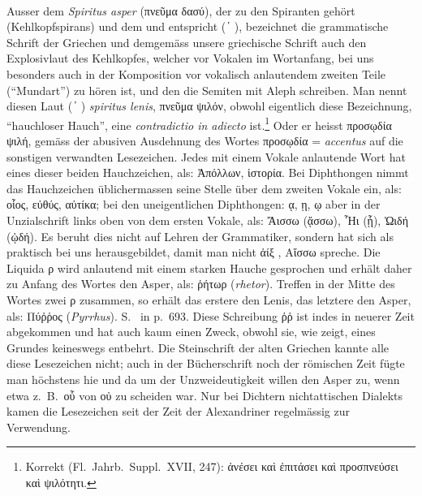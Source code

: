 \paragraph{} Ausser dem \emph{Spiritus asper} (πνεῦμα δασύ), der zu den Spiranten
gehört (Kehlkopfspirans) und dem  und
  entspricht {(\hspace{0.3em}  ̔\ )}, bezeichnet die grammatische Schrift der Griechen und demgemäss unsere griechische Schrift auch den Explosivlaut des Kehlkopfes, welcher vor Vokalen im Wortanfang, bei uns besonders auch in der Komposition vor vokalisch anlautendem zweiten Teile (“Mundart”) zu hören ist, und den die Semiten mit Aleph schreiben.
Man nennt diesen Laut {(\hspace{0.3em} ̓\ )} \emph{spiritus lenis}, πνεῦμα ψιλόν, obwohl eigentlich diese
Bezeichnung, “hauchloser Hauch”, eine \emph{contradictio in adiecto} ist.\footnote{
	Korrekt   (Fl.\ Jahrb.\ Suppl.\ XVII, 247):
	ἀνέσει καὶ ἐπιτάσει καὶ προσπνεύσει καὶ ψιλότητι.
}
Oder er heisst προσῳδία ψιλή, gemäss der abusiven Ausdehnung des Wortes προσῳδία
= \emph{accentus} auf die sonstigen verwandten Lesezeichen.
Jedes mit einem Vokale anlautende Wort hat eines dieser beiden Hauchzeichen, als: Ἀπόλλων, ἱστορία.
Bei Diphthongen nimmt das Hauchzeichen üblichermassen seine Stelle über dem zweiten Vokale ein, als: οἷος, εὐθύς, αὐτίκα; bei den uneigentlichen Diphthongen: ᾳ, ῃ, ῳ aber in der Unzialschrift links oben von dem ersten Vokale, als: Ἄισσω (ᾄσσω), Ἧι (ᾗ), Ὠιδή (ᾠδή).
Es beruht dies nicht auf Lehren der Grammatiker, sondern hat sich als praktisch
bei uns herausgebildet, damit man nicht ἀίξ , Αἴσσω  spreche.
Die Liquida ρ wird anlautend mit einem starken Hauche gesprochen und erhält
daher zu Anfang des Wortes den Asper, als: ῥήτωρ (\emph{rhetor}).
Treffen in der Mitte des Wortes zwei ρ zusammen, so erhält das erstere den
Lenis, das letztere den Asper, als: Πύῤῥος (\emph{Pyrrhus}).
S.\  in  p.\ 693.
Diese Schreibung ῤῥ ist indes in neuerer Zeit abgekommen und hat auch kaum einen
Zweck, obwohl sie, wie   zeigt, eines Grundes keineswegs entbehrt.
Die Steinschrift der alten Griechen kannte alle diese Lesezeichen nicht; auch in
der Bücherschrift noch der römischen Zeit fügte man höchstens hie und da um der
Unzweideutigkeit willen den Asper zu, wenn etwa z.~B.\ οὗ von οὐ zu scheiden war.
Nur bei Dichtern nichtattischen Dialekts kamen die Lesezeichen seit der Zeit der
Alexandriner regelmässig zur Verwendung.

